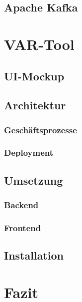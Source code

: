 \documentclass[10pt,a4paper]{report}
\begin{document}
  \section{Apache Kafka}

  \chapter{VAR-Tool}
  \section{UI-Mockup}
  \section{Architektur}
  \subsection{Geschäftsprozesse}
  \subsection{Deployment}
  \section{Umsetzung}
  \subsection{Backend}
  \subsection{Frontend}
  \section{Installation}

  \chapter{Fazit}

\end{document}
